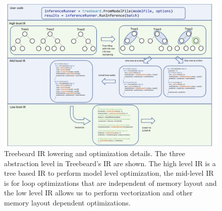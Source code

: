 \begin{figure}
  \centering
  \includegraphics[width=\textwidth]{figures/OverviewExample.pdf}
  \caption{Treebeard IR lowering and optimization details. The three abstraction level in Treebeard's IR are shown. The
           high level IR is a tree based IR to perform model level optimization, the mid-level IR is for
           loop optimizations that are independent of memory layout and the low level IR allows us to perform
           vectorization and other memory layout dependent optimizations.}
  \label{Fig:Overview}
\end{figure}




